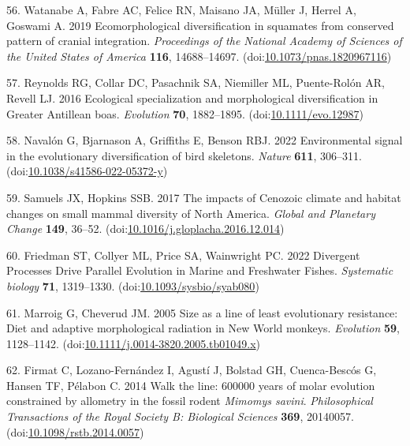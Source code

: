 \documentclass[
  11pt,
]{article}
\begin{document}
\leavevmode\hypertarget{ref-Watanabe2019}{}%
56. Watanabe A, Fabre AC, Felice RN, Maisano JA, Müller J, Herrel A,
Goswami A. 2019 Ecomorphological diversification in squamates from
conserved pattern of cranial integration. \emph{Proceedings of the
National Academy of Sciences of the United States of America}
\textbf{116}, 14688--14697.
(doi:\href{https://doi.org/10.1073/pnas.1820967116}{10.1073/pnas.1820967116})

\leavevmode\hypertarget{ref-Reynolds2016}{}%
57. Reynolds RG, Collar DC, Pasachnik SA, Niemiller ML, Puente-Rolón AR,
Revell LJ. 2016 Ecological specialization and morphological
diversification in Greater Antillean boas. \emph{Evolution} \textbf{70},
1882--1895.
(doi:\href{https://doi.org/10.1111/evo.12987}{10.1111/evo.12987})

\leavevmode\hypertarget{ref-Navalon2022}{}%
58. Navalón G, Bjarnason A, Griffiths E, Benson RBJ. 2022 Environmental
signal in the evolutionary diversification of bird skeletons.
\emph{Nature} \textbf{611}, 306--311.
(doi:\href{https://doi.org/10.1038/s41586-022-05372-y}{10.1038/s41586-022-05372-y})

\leavevmode\hypertarget{ref-SamuelsHopkins2017}{}%
59. Samuels JX, Hopkins SSB. 2017 The impacts of Cenozoic climate and
habitat changes on small mammal diversity of North America. \emph{Global
and Planetary Change} \textbf{149}, 36--52.
(doi:\href{https://doi.org/10.1016/j.gloplacha.2016.12.014}{10.1016/j.gloplacha.2016.12.014})

\leavevmode\hypertarget{ref-Friedman2022}{}%
60. Friedman ST, Collyer ML, Price SA, Wainwright PC. 2022 Divergent
Processes Drive Parallel Evolution in Marine and Freshwater Fishes.
\emph{Systematic biology} \textbf{71}, 1319--1330.
(doi:\href{https://doi.org/10.1093/sysbio/syab080}{10.1093/sysbio/syab080})

\leavevmode\hypertarget{ref-MarroigCheverud2005}{}%
61. Marroig G, Cheverud JM. 2005 Size as a line of least evolutionary
resistance: Diet and adaptive morphological radiation in New World
monkeys. \emph{Evolution} \textbf{59}, 1128--1142.
(doi:\href{https://doi.org/10.1111/j.0014-3820.2005.tb01049.x}{10.1111/j.0014-3820.2005.tb01049.x})

\leavevmode\hypertarget{ref-Firmat2014}{}%
62. Firmat C, Lozano-Fernández I, Agustí J, Bolstad GH, Cuenca-Bescós G,
Hansen TF, Pélabon C. 2014 Walk the line: 600000 years of molar
evolution constrained by allometry in the fossil rodent \emph{Mimomys
savini}. \emph{Philosophical Transactions of the Royal Society B:
Biological Sciences} \textbf{369}, 20140057.
(doi:\href{https://doi.org/10.1098/rstb.2014.0057}{10.1098/rstb.2014.0057})
\end{document}
